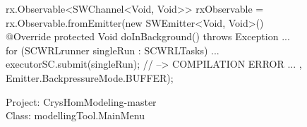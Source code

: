 \begin{figure}[H]
\begin{sourcecode}
\begin{javacode}{7}
rx.Observable<SWChannel<Void, Void>> rxObservable = rx.Observable.fromEmitter(new SWEmitter<Void, Void>(){
	@Override
	protected Void doInBackground() throws Exception {
		...
					for (SCWRLrunner singleRun : SCWRLTasks) {
						...
						executorSC.submit(singleRun); // --> COMPILATION ERROR
					}
		...
	}
}, Emitter.BackpressureMode.BUFFER);
\end{javacode}
\caption{Project: CrysHomModeling-master\\ Class: modellingTool.MainMenu}
\label{code:nested-swingworkers}
\end{sourcecode}
\end{figure}
